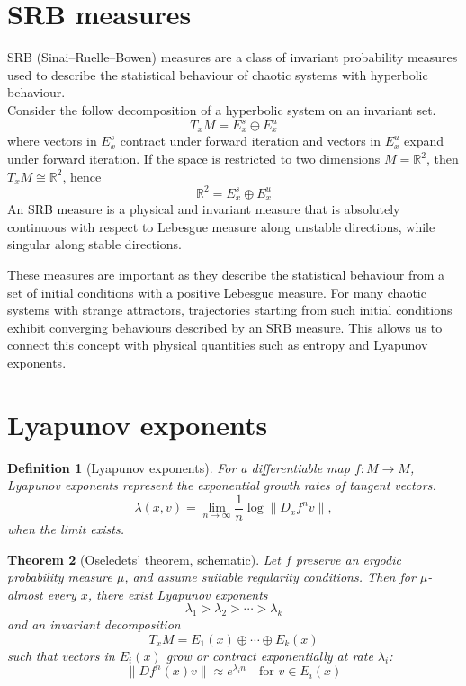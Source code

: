 \documentclass[11pt,a4paper]{article}
\newtheorem{theorem}{Theorem}[section]
\newtheorem{definition}[theorem]{Definition}
\begin{document}
\section{SRB measures}

SRB (Sinai--Ruelle--Bowen) measures are a class of invariant probability measures used to describe the statistical behaviour of chaotic systems with hyperbolic behaviour. \\
Consider the follow decomposition of a hyperbolic system on an invariant set.
\[
	T_xM = E_x^s \oplus E_x^u
\]
where vectors in \(E_x^s\) contract under forward iteration and vectors in \(E_x^u\) expand under forward iteration.
If the space is restricted to two dimensions \(M = \mathbb R^2\), then \(T_xM \cong \mathbb R^2\), hence
\[
	\mathbb R^2 = E_x^s \oplus E_x^u
\]
An SRB measure is a physical and invariant measure that is absolutely continuous with respect to Lebesgue measure along unstable directions, while singular along stable directions.

These measures are important as they describe the statistical behaviour from a set of initial conditions with a positive Lebesgue measure. For many chaotic systems with strange attractors, trajectories starting from such initial conditions exhibit converging behaviours described by an SRB measure. This allows us to connect this concept with physical quantities such as entropy and Lyapunov exponents.

\section{Lyapunov exponents}

\begin{definition}[Lyapunov exponents]
	For a differentiable map \(f:M\to M\), Lyapunov exponents represent the exponential growth rates of tangent vectors.
	\[
		\lambda(x,v)
		= \lim_{n\to\infty}\frac1n\log\|D_xf^n v\|,
	\]
	when the limit exists.
\end{definition}
\begin{theorem}[Oseledets' theorem, schematic]
	Let \(f\) preserve an ergodic probability measure \(\mu\), and assume suitable regularity conditions. Then for \(\mu\)-almost every \(x\), there exist Lyapunov exponents
	\[
		\lambda_1 > \lambda_2 > \cdots > \lambda_k
	\]
	and an invariant decomposition
	\[
		T_xM = E_1(x)\oplus \cdots \oplus E_k(x)
	\]
	such that vectors in \(E_i(x)\) grow or contract exponentially at rate \(\lambda_i\):
	\[
		\|Df^n(x)v\| \approx e^{\lambda_i n}
		\quad \text{for } v \in E_i(x)
	\]
\end{theorem}
\end{document}
